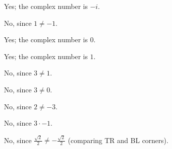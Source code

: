 \documentclass[../gatm_answers.tex]{subfiles}
\begin{document}
Yes; the complex number is $-i$.

\begin{iinner_problem}
\item {}
\end{iinner_problem}

No, since $1\neq -1$.

\begin{iinner_problem}
\item {}
\end{iinner_problem}

Yes; the complex number is $0$.

\begin{iinner_problem}
\item {}
\end{iinner_problem}

Yes; the complex number is $1$.

\begin{iinner_problem}
\item {}
\end{iinner_problem}

No, since $3\neq 1$.

\begin{iinner_problem}
\item {}
\end{iinner_problem}

No, since $3\neq 0$.

\begin{iinner_problem}
\item {}
\end{iinner_problem}

No, since $2\neq -3$.

\begin{iinner_problem}
\item {}
\end{iinner_problem}

No, since $3\cdot -1$.

\begin{iinner_problem}
\item {}
\end{iinner_problem}

No, since $\frac{\sqrt{2}}{2} \neq -\frac{\sqrt{2}}{2}$ (comparing TR and BL corners).

\begin{iinner_problem}
\item {}
\end{iinner_problem}
\end{document}
